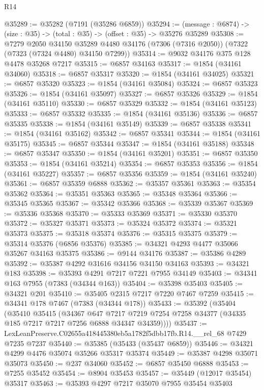 \begin{lexlean}{R14}
\begin{coremodule}
@35289 := @35282 (@7191 (@35286 @6859))
@35294 := (message : @6874) -> (size : @35) -> (total : @35) -> (offset : @35) -> @35276 @35289
@35308 := @7279
    @2050
    @34150
    @35289
    @4480
    @34176
    (@7306 (@7316 @2050))
    (@7322 (@7323 (@7324 @4480) @34150 @7299))
@35314 := @9032 @34176 @375 @128 @4478 @35268 @7217
@35315 := @6857 @34163
@35317 := @1854 (@34161 @34060)
@35318 := @6857 @35317
@35320 := @1854 (@34161 @34025)
@35321 := @6857 @35320
@35323 := @1854 (@34161 @35084)
@35324 := @6857 @35323
@35326 := @1854 (@34161 @35097)
@35327 := @6857 @35326
@35329 := @1854 (@34161 @35110)
@35330 := @6857 @35329
@35332 := @1854 (@34161 @35123)
@35333 := @6857 @35332
@35335 := @1854 (@34161 @35136)
@35336 := @6857 @35335
@35338 := @1854 (@34161 @35149)
@35339 := @6857 @35338
@35341 := @1854 (@34161 @35162)
@35342 := @6857 @35341
@35344 := @1854 (@34161 @35175)
@35345 := @6857 @35344
@35347 := @1854 (@34161 @35188)
@35348 := @6857 @35347
@35350 := @1854 (@34161 @35201)
@35351 := @6857 @35350
@35353 := @1854 (@34161 @35214)
@35354 := @6857 @35353
@35356 := @1854 (@34161 @35227)
@35357 := @6857 @35356
@35359 := @1854 (@34161 @35240)
@35361 := @6857 @35359 @6888
@35362 := @35357 @35361
@35363 := @35354 @35362
@35364 := @35351 @35363
@35365 := @35348 @35364
@35366 := @35345 @35365
@35367 := @35342 @35366
@35368 := @35339 @35367
@35369 := @35336 @35368
@35370 := @35333 @35369
@35371 := @35330 @35370
@35372 := @35327 @35371
@35373 := @35324 @35372
@35374 := @35321 @35373
@35375 := @35318 @35374
@35376 := @35315 @35375
@35379 := @35314 @35376 (@6856 @35376)
@35385 := @34321 @4293 @4477 @35066 @35267 @34163 @35375
@35386 := @9144 @34176
@35387 := @35386 @4289
@35392 := @35387 @4292 @31616 @34156 @34150 @34163
@35393 := @34321 @183
@35398 := @35393 @4291 @7217 @7221 @7955 @34149
@35403 := @34341 @163 @7955 (@7383 (@34344 @163))
@35404 := @35398 @35403
@35405 := @34321 @201
@35410 := @35405 @2315 @7217 @7220 @7467 @7259
@35415 := @34341 @178 @7467 (@7383 (@34344 @178))
@35433 := @35392
    (@35404
      (@35410
        @35415
        (@34367
          @647
          @7217
          @7219
          @7254
          @7258
          @34377
          (@34335 @185 @7217 @7217 @7256 @6888 @34347 @34359))))
@35437 := LexLeanPreserve.C02655a418445380eb5a1782f5dbb17fb.R14.__rel_68 @7429 @7235 @7237
@35440 := @35385 (@35433 (@35437 @6859))
@35446 := @34321 @4299 @4476 @35074 @35266 @35317 @35374
@35449 := @35387 @4298 @35071 @35073
@35450 := @237 @34060
@35452 := @6857 @35450 @6888
@35453 := @7255 @35452
@35454 := @8904 @35453
@35457 := @35449 (@12017 @35454) @35317
@35463 := @35393 @4297 @7217 @35070 @7955 @35454 @35403

\end{coremodule}
\end{lexlean}
